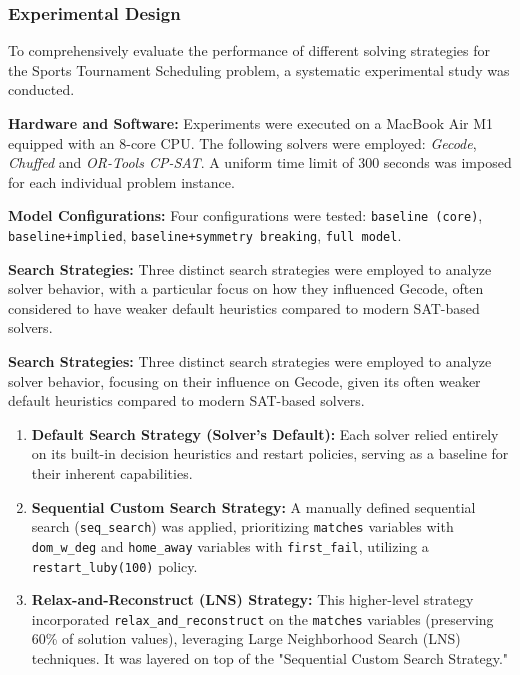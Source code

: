 \subsubsection{Experimental Design}

To comprehensively evaluate the performance of different solving strategies for the Sports Tournament Scheduling problem, a systematic experimental study was conducted.

\textbf{Hardware and Software:}
Experiments were executed on a MacBook Air M1 equipped with an 8-core CPU. The following solvers were employed: \textit{Gecode}, \textit{Chuffed} and \textit{OR-Tools CP-SAT}. 
A uniform time limit of $300$ seconds was imposed for each individual problem instance.

\textbf{Model Configurations:}
Four configurations were tested: \texttt{baseline (core)}, \texttt{baseline+implied}, \texttt{baseline+symmetry breaking}, \texttt{full model}.

\textbf{Search Strategies:}
Three distinct search strategies were employed to analyze solver behavior, with a particular focus on how they influenced Gecode, often considered to have weaker default heuristics compared to modern SAT-based solvers.

\textbf{Search Strategies:}
Three distinct search strategies were employed to analyze solver behavior, focusing on their influence on Gecode, given its often weaker default heuristics compared to modern SAT-based solvers.

\begin{enumerate}
    \item \textbf{Default Search Strategy (Solver's Default):} Each solver relied entirely on its built-in decision heuristics and restart policies, serving as a baseline for their inherent capabilities.

    \item \textbf{Sequential Custom Search Strategy:} A manually defined sequential search (\texttt{seq\_search}) was applied, prioritizing \texttt{matches} variables with \texttt{dom\_w\_deg} and \texttt{home\_away} variables with \texttt{first\_fail}, utilizing a \texttt{restart\_luby(100)} policy.

    \item \textbf{Relax-and-Reconstruct (LNS) Strategy:} This higher-level strategy incorporated \texttt{relax\_and\_reconstruct} on the \texttt{matches} variables (preserving 60\% of solution values), leveraging Large Neighborhood Search (LNS) techniques. It was layered on top of the "Sequential Custom Search Strategy."
\end{enumerate}

